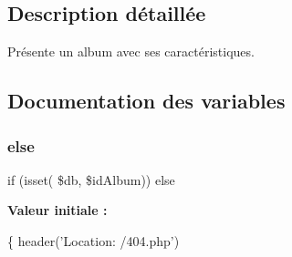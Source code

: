 \subsection{Description détaillée}
Présente un album avec ses caractéristiques. 



\subsection{Documentation des variables}
\mbox{\label{album_8php_a049128a47e20f401f34b7ff31df2a34f}} 
\subsubsection{\texorpdfstring{else}{else}}
{\footnotesize\ttfamily if (isset( \$db, \$id\+Album)) else}

{\bfseries Valeur initiale \+:}
\begin{DoxyCode}
\{
    header(\textcolor{stringliteral}{'Location: /404.php'})
\end{DoxyCode}
